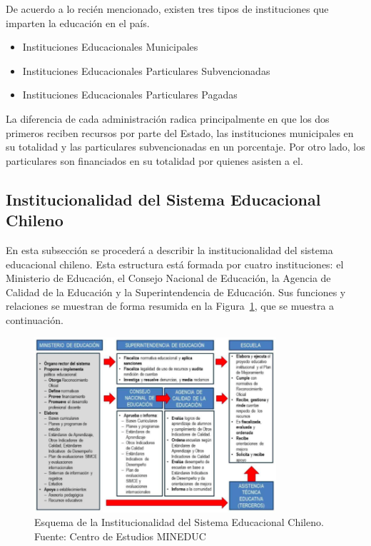 De acuerdo a lo recién mencionado, existen tres tipos de instituciones que imparten la educación en el país.

\begin{itemize}
\item Instituciones Educacionales Municipales
\item Instituciones Educacionales Particulares Subvencionadas
\item Instituciones Educacionales Particulares Pagadas
\end{itemize}

La diferencia de cada administración radica principalmente en que los dos primeros reciben recursos por parte del Estado, las instituciones municipales en su totalidad y las particulares subvencionadas en un porcentaje. Por otro lado, los particulares son financiados en su totalidad por quienes asisten a el. 


\subsection{Institucionalidad del Sistema Educacional Chileno}

En esta subsección se procederá a describir la institucionalidad del sistema educacional chileno. Esta estructura está formada por cuatro instituciones: el Ministerio de Educación, el Consejo Nacional de Educación, la Agencia de Calidad de la Educación y la Superintendencia de Educación. Sus funciones y relaciones se muestran de forma resumida en la Figura~\ref{fig:esquema}, que se muestra a continuación. 

\begin{figure}[H]
  \centering
    \includegraphics[width=0.8\textwidth]{Figuras/Institucionalidad}
      \caption{Esquema de la Institucionalidad del Sistema Educacional Chileno. Fuente: Centro de Estudios MINEDUC}
    \label{fig:esquema}
\end{figure}

